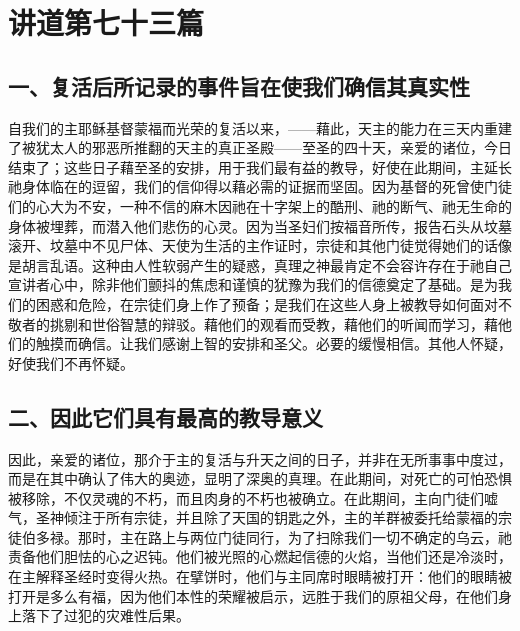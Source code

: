 
\section{讲道第七十三篇}

\par


\subsection{一、复活后所记录的事件旨在使我们确信其真实性}

自我们的主耶稣基督蒙福而光荣的复活以来，——藉此，天主的能力在三天内重建了被犹太人的邪恶所推翻的天主的真正圣殿——至圣的四十天，亲爱的诸位，今日结束了；这些日子藉至圣的安排，用于我们最有益的教导，好使在此期间，主延长祂身体临在的逗留，我们的信仰得以藉必需的证据而坚固。因为基督的死曾使门徒们的心大为不安，一种不信的麻木因祂在十字架上的酷刑、祂的断气、祂无生命的身体被埋葬，而潜入他们悲伤的心灵。因为当圣妇们按福音所传，报告石头从坟墓滚开、坟墓中不见尸体、天使为生活的主作证时，宗徒和其他门徒觉得她们的话像是胡言乱语。这种由人性软弱产生的疑惑，真理之神最肯定不会容许存在于祂自己宣讲者心中，除非他们颤抖的焦虑和谨慎的犹豫为我们的信德奠定了基础。是为我们的困惑和危险，在宗徒们身上作了预备；是我们在这些人身上被教导如何面对不敬者的挑剔和世俗智慧的辩驳。藉他们的观看而受教，藉他们的听闻而学习，藉他们的触摸而确信。让我们感谢上智的安排和圣父。必要的缓慢相信。其他人怀疑，好使我们不再怀疑。\par


\subsection{二、因此它们具有最高的教导意义}

因此，亲爱的诸位，那介于主的复活与升天之间的日子，并非在无所事事中度过，而是在其中确认了伟大的奥迹，显明了深奥的真理。在此期间，对死亡的可怕恐惧被移除，不仅灵魂的不朽，而且肉身的不朽也被确立。在此期间，主向门徒们嘘气，圣神倾注于所有宗徒，并且除了天国的钥匙之外，主的羊群被委托给蒙福的宗徒伯多禄。那时，主在路上与两位门徒同行，为了扫除我们一切不确定的乌云，祂责备他们胆怯的心之迟钝。他们被光照的心燃起信德的火焰，当他们还是冷淡时，在主解释圣经时变得火热。在擘饼时，他们与主同席时眼睛被打开：他们的眼睛被打开是多么有福，因为他们本性的荣耀被启示，远胜于我们的原祖父母，在他们身上落下了过犯的灾难性后果。\par

